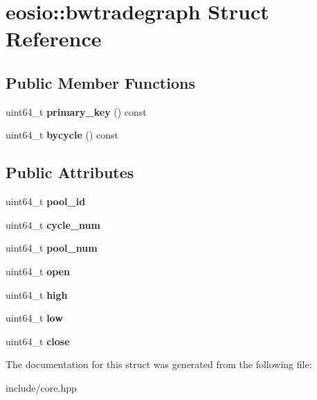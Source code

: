 \hypertarget{structeosio_1_1bwtradegraph}{}\section{eosio\+:\+:bwtradegraph Struct Reference}
\label{structeosio_1_1bwtradegraph}
\subsection*{Public Member Functions}
\begin{DoxyCompactItemize}
\item 
\mbox{\label{structeosio_1_1bwtradegraph_a51f1a7c434df0e552d838cf349f91b3c}} 
uint64\+\_\+t {\bfseries primary\+\_\+key} () const
\item 
\mbox{\label{structeosio_1_1bwtradegraph_a0d2fa03fb6abf23823d6f25b700c342a}} 
uint64\+\_\+t {\bfseries bycycle} () const
\end{DoxyCompactItemize}
\subsection*{Public Attributes}
\begin{DoxyCompactItemize}
\item 
\mbox{\label{structeosio_1_1bwtradegraph_a37a38447fc94ffeb1a4dfaa301e3a802}} 
uint64\+\_\+t {\bfseries pool\+\_\+id}
\item 
\mbox{\label{structeosio_1_1bwtradegraph_aaa5fa4fb100603838a04f7554a572fe1}} 
uint64\+\_\+t {\bfseries cycle\+\_\+num}
\item 
\mbox{\label{structeosio_1_1bwtradegraph_a9e9cf78d41d94f3ad6d2d29350a33875}} 
uint64\+\_\+t {\bfseries pool\+\_\+num}
\item 
\mbox{\label{structeosio_1_1bwtradegraph_a90e7080d618b9baa5a1d16f76174b65b}} 
uint64\+\_\+t {\bfseries open}
\item 
\mbox{\label{structeosio_1_1bwtradegraph_a141a93e5fa16b1684b3254aafb00fdf6}} 
uint64\+\_\+t {\bfseries high}
\item 
\mbox{\label{structeosio_1_1bwtradegraph_a0efa4caf8b12a228cd669be56cc4562c}} 
uint64\+\_\+t {\bfseries low}
\item 
\mbox{\label{structeosio_1_1bwtradegraph_a8d3a1683901c961f491417f53ac5dbd5}} 
uint64\+\_\+t {\bfseries close}
\end{DoxyCompactItemize}


The documentation for this struct was generated from the following file\+:\begin{DoxyCompactItemize}
\item 
include/core.\+hpp\end{DoxyCompactItemize}
